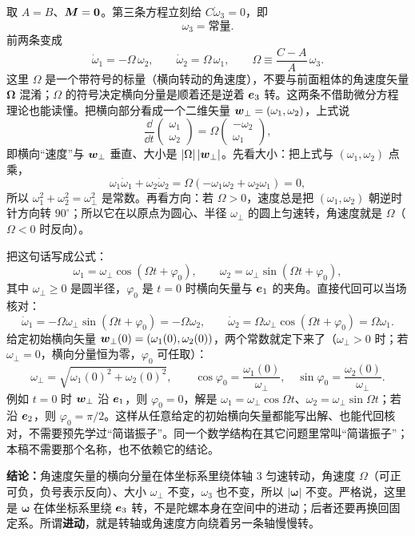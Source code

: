 \documentclass[11pt]{ctexart}
\begin{document}
取 $A=B$、$\boldsymbol{M}=\boldsymbol{0}$。第三条方程立刻给 $C\dot\omega_3=0$，即
\[
\omega_3=\text{常量}.
\]
前两条变成
\[
\dot\omega_1=-\Omega\,\omega_2,\qquad \dot\omega_2=\Omega\,\omega_1,
\qquad \Omega\equiv\frac{C-A}{A}\,\omega_3 .
\]
这里 $\Omega$ 是一个带符号的标量（横向转动的角速度），不要与前面粗体的角速度矢量 $\boldsymbol\Omega$ 混淆；$\Omega$ 的符号决定横向分量是顺着还是逆着 $\boldsymbol{e}_3$ 转。这两条不借助微分方程理论也能读懂。把横向部分看成一个二维矢量 $\boldsymbol{w}_\perp=(\omega_1,\omega_2)$，上式说
\[
\frac{\dd}{\dd t}\begin{pmatrix}\omega_1\\\omega_2\end{pmatrix}
=\Omega\begin{pmatrix}-\omega_2\\\omega_1\end{pmatrix},
\]
即横向“速度”与 $\boldsymbol{w}_\perp$ 垂直、大小是 $|\Omega|\,|\boldsymbol{w}_\perp|$。先看大小：把上式与 $(\omega_1,\omega_2)$ 点乘，
\[
\omega_1\dot\omega_1+\omega_2\dot\omega_2
=\Omega(-\omega_1\omega_2+\omega_2\omega_1)=0,
\]
所以 $\omega_1^2+\omega_2^2=\omega_\perp^2$ 是常数。再看方向：若 $\Omega>0$，速度总是把 $(\omega_1,\omega_2)$ 朝逆时针方向转 $90^\circ$；所以它在以原点为圆心、半径 $\omega_\perp$ 的圆上匀速转，角速度就是 $\Omega$（$\Omega<0$ 时反向）。

把这句话写成公式：
\[
\omega_1=\omega_\perp\cos(\Omega t+\varphi_0),\qquad
\omega_2=\omega_\perp\sin(\Omega t+\varphi_0),
\]
其中 $\omega_\perp\ge0$ 是圆半径，$\varphi_0$ 是 $t=0$ 时横向矢量与 $\boldsymbol{e}_1$ 的夹角。直接代回可以当场核对：
\[
\dot\omega_1=-\Omega\omega_\perp\sin(\Omega t+\varphi_0)=-\Omega\omega_2,
\qquad
\dot\omega_2=\Omega\omega_\perp\cos(\Omega t+\varphi_0)=\Omega\omega_1 .
\]
给定初始横向矢量 $\boldsymbol{w}_\perp(0)=(\omega_1(0),\omega_2(0))$，两个常数就定下来了（$\omega_\perp>0$ 时；若 $\omega_\perp=0$，横向分量恒为零，$\varphi_0$ 可任取）：
\[
\omega_\perp=\sqrt{\omega_1(0)^2+\omega_2(0)^2},
\qquad
\cos\varphi_0=\frac{\omega_1(0)}{\omega_\perp},\quad
\sin\varphi_0=\frac{\omega_2(0)}{\omega_\perp}.
\]
例如 $t=0$ 时 $\boldsymbol{w}_\perp$ 沿 $\boldsymbol{e}_1$，则 $\varphi_0=0$，解是 $\omega_1=\omega_\perp\cos\Omega t$、$\omega_2=\omega_\perp\sin\Omega t$；若沿 $\boldsymbol{e}_2$，则 $\varphi_0=\pi/2$。这样从任意给定的初始横向矢量都能写出解、也能代回核对，不需要预先学过“简谐振子”。同一个数学结构在其它问题里常叫“简谐振子”；本稿不需要那个名称，也不依赖它的结论。

\textbf{结论：}角速度矢量的横向分量在体坐标系里绕体轴 $3$ 匀速转动，角速度 $\Omega$（可正可负，负号表示反向）、大小 $\omega_\perp$ 不变，$\omega_3$ 也不变，所以 $|\boldsymbol\omega|$ 不变。严格说，这里是 $\boldsymbol\omega$ 在体坐标系里绕 $\boldsymbol{e}_3$ 转，不是陀螺本身在空间中的进动；后者还要再换回固定系。所谓\textbf{进动}，就是转轴或角速度方向绕着另一条轴慢慢转。
\end{document}
